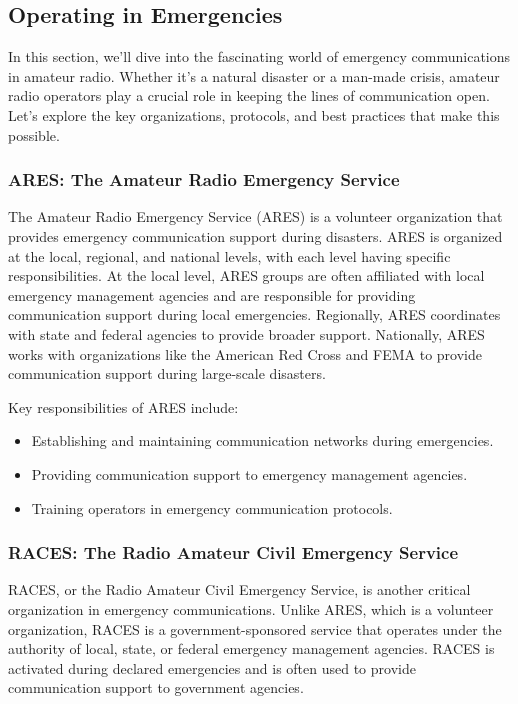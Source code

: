\subsection{Operating in Emergencies}
\label{subsec:emerg-ops}

In this section, we'll dive into the fascinating world of emergency communications in amateur radio. Whether it's a natural disaster or a man-made crisis, amateur radio operators play a crucial role in keeping the lines of communication open. Let's explore the key organizations, protocols, and best practices that make this possible.

\subsubsection*{ARES: The Amateur Radio Emergency Service}
The Amateur Radio Emergency Service (ARES) is a volunteer organization that provides emergency communication support during disasters. ARES is organized at the local, regional, and national levels, with each level having specific responsibilities. At the local level, ARES groups are often affiliated with local emergency management agencies and are responsible for providing communication support during local emergencies. Regionally, ARES coordinates with state and federal agencies to provide broader support. Nationally, ARES works with organizations like the American Red Cross and FEMA to provide communication support during large-scale disasters.

Key responsibilities of ARES include:
\begin{itemize}
    \item Establishing and maintaining communication networks during emergencies.
    \item Providing communication support to emergency management agencies.
    \item Training operators in emergency communication protocols.
\end{itemize}

\subsubsection*{RACES: The Radio Amateur Civil Emergency Service}
RACES, or the Radio Amateur Civil Emergency Service, is another critical organization in emergency communications. Unlike ARES, which is a volunteer organization, RACES is a government-sponsored service that operates under the authority of local, state, or federal emergency management agencies. RACES is activated during declared emergencies and is often used to provide communication support to government agencies.

